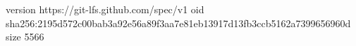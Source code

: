 version https://git-lfs.github.com/spec/v1
oid sha256:2195d572c00bab3a92e56a89f3aa7e81eb13917d13fb3ccb5162a7399656960d
size 5566
